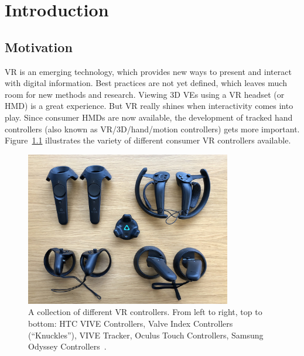 \chapter{Introduction}\label{chapter:introduction}

\section{Motivation}\label{section:motivation}

\ac{VR} is an emerging technology, which provides new ways to present and interact with digital information. Best practices are not yet defined, which leaves much room for new methods and research. Viewing \ac{3D} \acp{VE} using a \ac{VR} headset (or \ac{HMD}) is a great experience. But \ac{VR} really shines when interactivity comes into play. Since consumer \acp{HMD} are now available, the development of tracked hand controllers (also known as \ac{VR}/\ac{3D}/hand/motion controllers) gets more important. Figure~\ref{fig:vr-controllers} illustrates the variety of different consumer \ac{VR} controllers available.

\begin{figure}[htpb]%
  \centering%
  \includegraphics[width=9cm]{figures/introduction/vr_controllers.jpg}%
  \caption[Collection of VR controllers]{A collection of different \ac{VR} controllers. From left to right, top to bottom: HTC VIVE Controllers, Valve Index Controllers (\enquote{Knuckles}), VIVE Tracker, Oculus Touch Controllers, Samsung Odyssey Controllers~\cite{Yang.2018}.}\label{fig:vr-controllers}
\end{figure}

